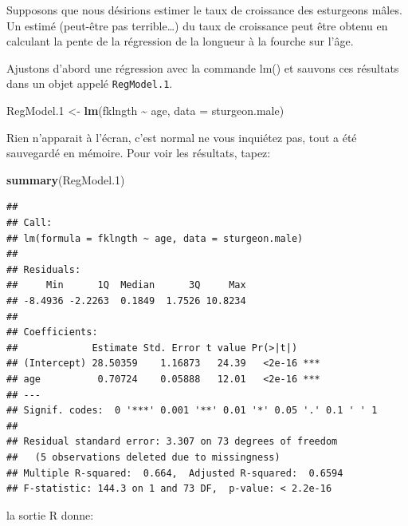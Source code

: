 \documentclass[
  12pt,
]{book}
\newenvironment{Shaded}{\begin{snugshade}}{\end{snugshade}}
\newcommand{\DataTypeTok}[1]{\textcolor[rgb]{0.13,0.29,0.53}{#1}}
\newcommand{\FloatTok}[1]{\textcolor[rgb]{0.00,0.00,0.81}{#1}}
\newcommand{\KeywordTok}[1]{\textcolor[rgb]{0.13,0.29,0.53}{\textbf{#1}}}
\newcommand{\NormalTok}[1]{#1}
\newcommand{\OperatorTok}[1]{\textcolor[rgb]{0.81,0.36,0.00}{\textbf{#1}}}
\newcommand{\StringTok}[1]{\textcolor[rgb]{0.31,0.60,0.02}{#1}}
\begin{document}
Supposons que nous désirions estimer le taux de croissance des esturgeons mâles.
Un estimé (peut-être pas terrible\ldots) du taux de croissance peut être obtenu en calculant la pente de la régression de la longueur à la fourche sur l'âge.

Ajustons d'abord une régression avec la commande lm() et sauvons ces résultats dans un objet appelé \texttt{RegModel.1}.

\begin{Shaded}
\begin{Highlighting}[]
\NormalTok{RegModel}\FloatTok{.1}\NormalTok{ \textless{}{-}}\StringTok{ }\KeywordTok{lm}\NormalTok{(fklngth }\OperatorTok{\textasciitilde{}}\StringTok{ }\NormalTok{age, }\DataTypeTok{data =}\NormalTok{ sturgeon.male)}
\end{Highlighting}
\end{Shaded}

Rien n'apparait à l'écran, c'est normal ne vous inquiétez pas, tout a été sauvegardé en mémoire.
Pour voir les résultats, tapez:

\begin{Shaded}
\begin{Highlighting}[]
\KeywordTok{summary}\NormalTok{(RegModel}\FloatTok{.1}\NormalTok{)}
\end{Highlighting}
\end{Shaded}

\begin{verbatim}
## 
## Call:
## lm(formula = fklngth ~ age, data = sturgeon.male)
## 
## Residuals:
##     Min      1Q  Median      3Q     Max 
## -8.4936 -2.2263  0.1849  1.7526 10.8234 
## 
## Coefficients:
##             Estimate Std. Error t value Pr(>|t|)    
## (Intercept) 28.50359    1.16873   24.39   <2e-16 ***
## age          0.70724    0.05888   12.01   <2e-16 ***
## ---
## Signif. codes:  0 '***' 0.001 '**' 0.01 '*' 0.05 '.' 0.1 ' ' 1
## 
## Residual standard error: 3.307 on 73 degrees of freedom
##   (5 observations deleted due to missingness)
## Multiple R-squared:  0.664,  Adjusted R-squared:  0.6594 
## F-statistic: 144.3 on 1 and 73 DF,  p-value: < 2.2e-16
\end{verbatim}

la sortie R donne:
\end{document}
